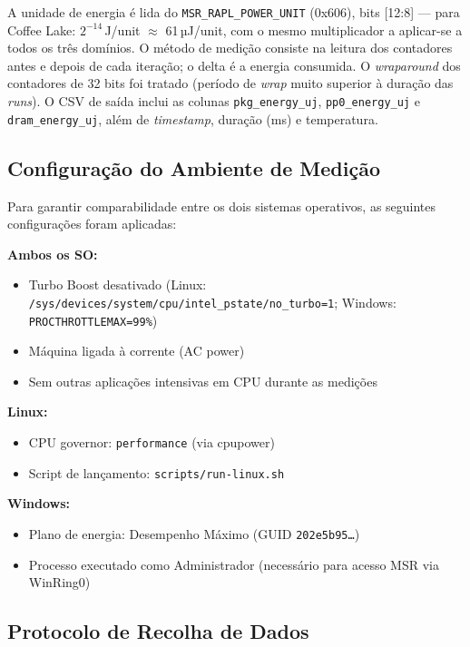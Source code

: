 \documentclass[12pt,a4paper]{article}
\begin{document}
A unidade de energia é lida do \texttt{MSR\_RAPL\_POWER\_UNIT} (0x606),
bits [12:8] --- para Coffee Lake: $2^{-14}$\,J/unit $\approx$ 61\,µJ/unit, com
o mesmo multiplicador a aplicar-se a todos os três domínios.
O método de medição consiste na leitura dos contadores antes e depois de cada
iteração; o delta é a energia consumida.
O \textit{wraparound} dos contadores de 32 bits foi tratado (período de
\textit{wrap} muito superior à duração das \textit{runs}).
O CSV de saída inclui as colunas \texttt{pkg\_energy\_uj}, \texttt{pp0\_energy\_uj}
e \texttt{dram\_energy\_uj}, além de \textit{timestamp}, duração (ms) e
temperatura.

\subsection{Configuração do Ambiente de Medição}

Para garantir comparabilidade entre os dois sistemas operativos, as seguintes
configurações foram aplicadas:

\textbf{Ambos os SO:}
\begin{itemize}
  \item Turbo Boost desativado
    (Linux: \texttt{/sys/devices/system/cpu/intel\_pstate/no\_turbo=1};
    Windows: \texttt{PROCTHROTTLEMAX=99\%})
  \item Máquina ligada à corrente (AC power)
  \item Sem outras aplicações intensivas em CPU durante as medições
\end{itemize}

\textbf{Linux:}
\begin{itemize}
  \item CPU governor: \texttt{performance} (via cpupower)
  \item Script de lançamento: \texttt{scripts/run-linux.sh}
\end{itemize}

\textbf{Windows:}
\begin{itemize}
  \item Plano de energia: Desempenho Máximo (GUID \texttt{202e5b95\ldots})
  \item Processo executado como Administrador (necessário para acesso MSR via
    WinRing0)
\end{itemize}

\subsection{Protocolo de Recolha de Dados}
\end{document}
